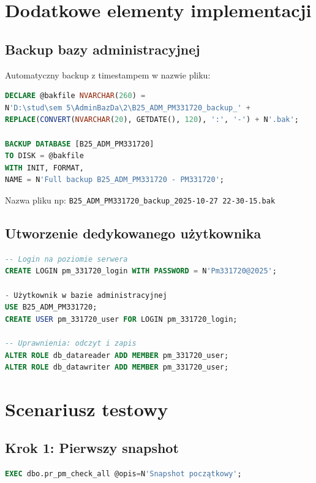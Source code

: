 \documentclass[a4paper,11pt]{article}
\begin{document}
	\section{Dodatkowe elementy implementacji}
	
	\subsection{Backup bazy administracyjnej}
	
	Automatyczny backup z timestampem w nazwie pliku:
	
	\begin{lstlisting}[language=SQL]
DECLARE @bakfile NVARCHAR(260) = 
N'D:\stud\sem 5\AdminBazDa\2\B25_ADM_PM331720_backup_' + 
REPLACE(CONVERT(NVARCHAR(20), GETDATE(), 120), ':', '-') + N'.bak';
		
BACKUP DATABASE [B25_ADM_PM331720]
TO DISK = @bakfile
WITH INIT, FORMAT, 
NAME = N'Full backup B25_ADM_PM331720 - PM331720';
	\end{lstlisting}
	
	Nazwa pliku np: \texttt{B25\_ADM\_PM331720\_backup\_2025-10-27 22-30-15.bak}
	
	\subsection{Utworzenie dedykowanego użytkownika}
	
	\begin{lstlisting}[language=SQL]
-- Login na poziomie serwera
CREATE LOGIN pm_331720_login WITH PASSWORD = N'Pm331720@2025';
		
- Użytkownik w bazie administracyjnej
USE B25_ADM_PM331720;
CREATE USER pm_331720_user FOR LOGIN pm_331720_login;
		
-- Uprawnienia: odczyt i zapis
ALTER ROLE db_datareader ADD MEMBER pm_331720_user;
ALTER ROLE db_datawriter ADD MEMBER pm_331720_user;
	\end{lstlisting}
	
	\section{Scenariusz testowy}
	
	\subsection{Krok 1: Pierwszy snapshot}
	\begin{lstlisting}[language=SQL]
EXEC dbo.pr_pm_check_all @opis=N'Snapshot początkowy';
	\end{lstlisting}
	
\end{document}
